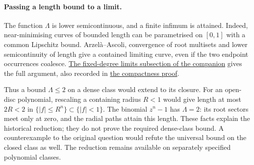\documentclass[11pt]{article}
\begin{document}
\paragraph{Passing a length bound to a limit.}
The function $\Lambda$ is lower semicontinuous, and a finite infimum is
attained. Indeed, near-minimising curves of bounded length can be
parametrised on $[0,1]$ with a common Lipschitz bound. Arzel\`a--Ascoli,
convergence of root multisets and lower semicontinuity of length give a
contained limiting curve, even if the two endpoint occurrences coalesce.
\href{erdos1041-lemniscate-reasoning-surface.pdf\#closed-class-limits}{The fixed-degree limits subsection of the companion} gives the full argument, also recorded in
\href{https://github.com/wcook04/plectis-erdos/blob/f36a98bf3d3e6f65f1074e3b800e3293d5b8a51a/ErdosProblems/Erdos1041/GenericSufficiencyClosure.md}{the compactness proof}.

Thus a bound $\Lambda\le2$ on a dense class would extend to its closure.
For an open-disc polynomial, rescaling a containing radius $R<1$ would
give length at most $2R<2$ in $\{|f|\le R^n\}\subset\{|f|<1\}$.
The binomial $z^n-1$ has $\Lambda=2$: its root sectors meet only at zero,
and the radial paths attain this length. These facts explain the
historical reduction; they do not prove the required dense-class bound.
A counterexample to the original question would refute the universal
bound on the closed class as well. The reduction remains available on
separately specified polynomial classes.
\end{document}
